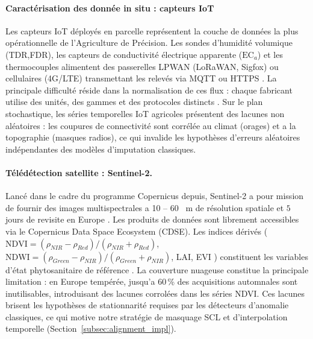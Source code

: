 \documentclass[12pt]{article}
\begin{document}
\paragraph{Caractérisation des donnée in situ : capteurs IoT}

Les capteurs IoT déployés en parcelle représentent la couche de données la plus opérationnelle de l’Agriculture de Précision. Les sondes d'humidité volumique (TDR,FDR), les capteurs de conductivité électrique apparente ($\text{EC}_a$) et les thermocouples alimentent des passerelles LPWAN (LoRaWAN, Sigfox) ou cellulaires (4G/LTE) transmettant les relevés via MQTT ou HTTPS \cite{iot_review_2025,iot_frontiers_2025}. La principale difficulté réside dans la normalisation de ces flux : chaque fabricant utilise des unités, des gammes et des protocoles distincts
\cite{iot_agronomy_2023}. Sur le plan stochastique, les séries temporelles
IoT agricoles présentent des lacunes non aléatoires : les coupures de connectivité sont corrélée au climat (orages) et a la topographie (masques radios), ce qui invalide les hypothèses d’erreurs aléatoires
indépendantes des modèles d'imputation classiques.

\paragraph{Télédétection satellite : Sentinel-2.} Lancé dans le cadre du programme Copernicus depuis, Sentinel-2 a pour mission de fournir des images multispectrales a 10 -- 60 ~m de résolution spatiale et $5$ jours de revisite en Europe \cite{sentinel2_ard_2022}. Les produits de données sont librement accessibles via le Copernicus Data Space Ecosystem (CDSE). Les indices dérivés (
$\text{NDVI} = (\rho_{NIR}-\rho_{Red})/(\rho_{NIR}+\rho_{Red})$,
$\text{NDWI} = (\rho_{Green}-\rho_{NIR})/(\rho_{Green}+\rho_{NIR})$,
LAI, EVI ) constituent les variables d'état phytosanitaire de référence \cite{ndvi_sentinel2_2023,ndvi_timeseries_2022}.
La couverture nuageuse constitue la principale limitation : en Europe
tempérée, jusqu'a 60\,\% des acquisitions automnales sont inutilisables,
introduisant des lacunes corrolées dans les séries NDVI. Ces lacunes
brisent les hypothèses de stationnarité requises par les détecteurs
d'anomalie classiques, ce qui motive notre stratégie de masquage SCL
et d'interpolation temporelle (Section~\ref{subsec:alignment_impl}).
\end{document}
